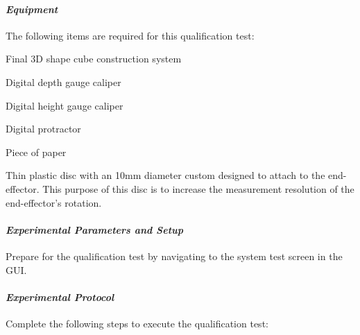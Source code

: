 \paragraph{\textit{Equipment}}

The following items are required for this qualification test:

\begin{compactitem}
    \item Final 3D shape cube construction system
    \item Digital depth gauge caliper
    \item Digital height gauge caliper
    \item Digital protractor
    \item Piece of paper
    \item Thin plastic disc with an 10mm diameter custom designed to attach to the end-effector. This purpose of this disc is to increase the measurement resolution of the end-effector's rotation.
\end{compactitem}

\paragraph{\textit{Experimental Parameters and Setup}}

Prepare for the qualification test by navigating to the system test screen in the GUI.

\paragraph{\textit{Experimental Protocol}}

Complete the following steps to execute the qualification test:


